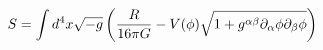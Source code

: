 \begin{equation}
S=\int{d^4x \sqrt{-g}\left({R \over {16\pi G}}- V(\phi) \sqrt{1+g^{\alpha \beta} \partial_\alpha \phi \partial_\beta \phi} \right)}
\label{action}
\end{equation}

